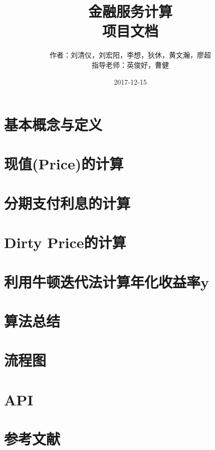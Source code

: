 \documentclass[12pt]{article}
\begin{document}
\begin{CJK}{UTF8}{song}

\newcommand{\bN}{\mathbb{N}}
\newcommand{\tabincell}[2]{\begin{tabular}{@{}#1@{}}#2\end{tabular}}  

\title{金融服务计算\\项目文档}
\date{2017-12-15}
\author{作者：刘清仪，刘宏阳，李想，狄休，黄文瀚，廖超\\指导老师：英俊好，曹健}



\maketitle

\tableofcontents

\newpage
\section{基本概念与定义}

 

\newpage
\section{现值(Price)的计算}


\newpage
\section{分期支付利息的计算}


\newpage
\section{Dirty Price的计算}


\newpage
\section{利用牛顿迭代法计算年化收益率y}


\newpage
\section{算法总结}


\newpage
\section{流程图}


\newpage
\section{API}


\newpage
\section{参考文献}



\end{CJK}
\end{document}
